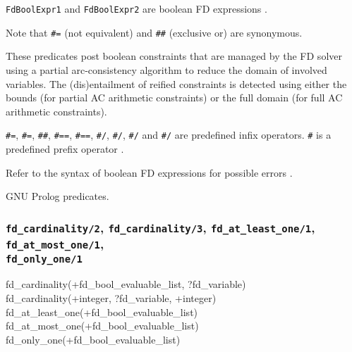 \texttt{FdBoolExpr1} and \texttt{FdBoolExpr2} are boolean FD expressions
.

Note that \texttt{\#{\bs}{\lt}={\gt}} (not equivalent) and \texttt{\#\#}
(exclusive or) are synonymous.

These predicates post boolean constraints that are managed by the FD solver
using a partial arc-consistency algorithm to reduce the domain of involved
variables. The (dis)entailment of reified constraints is detected using
either the bounds (for partial AC arithmetic constraints) or the full domain
(for full AC arithmetic constraints).

\texttt{\#{\lt}={\gt}}, \texttt{\#{\bs}{\lt}={\gt}}, \texttt{\#\#},
\texttt{\#=={\gt}}, \texttt{\#{\bs}=={\gt}}, \texttt{\#/{\bs}},
\texttt{\#{\bs}/{\bs}}, \texttt{\#{\bs}/} and \texttt{\#{\bs}{\bs}/} are
predefined infix operators. \texttt{\#{\bs}} is a predefined prefix operator
.

\Errors

Refer to the syntax of boolean FD expressions for possible errors
.

\Portability

GNU Prolog predicates.

\subsubsection{\texttt{fd\_cardinality/2},
               \texttt{fd\_cardinality/3},
               \texttt{fd\_at\_least\_one/1},
               \texttt{fd\_at\_most\_one/1}, \\
               \texttt{fd\_only\_one/1}}
\label{fd-cardinality/2}

\begin{TemplatesOneCol}
fd\_cardinality(+fd\_bool\_evaluable\_list, ?fd\_variable)\\
fd\_cardinality(+integer, ?fd\_variable, +integer)\\
fd\_at\_least\_one(+fd\_bool\_evaluable\_list)\\
fd\_at\_most\_one(+fd\_bool\_evaluable\_list)\\
fd\_only\_one(+fd\_bool\_evaluable\_list)

\end{TemplatesOneCol}

\Description

